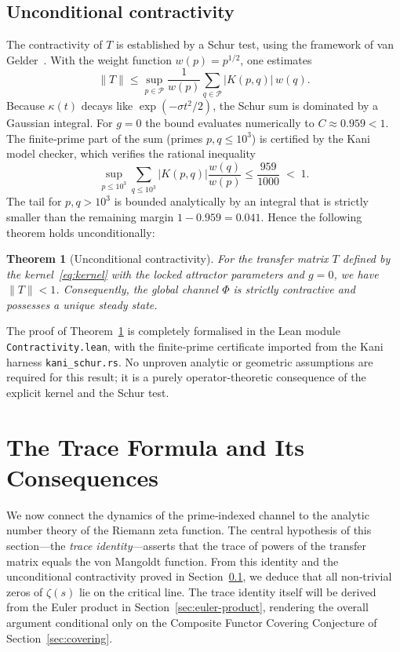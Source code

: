 \documentclass[11pt,reqno]{amsart}
\newtheorem{theorem}{Theorem}[section]
\theoremstyle{definition}
\theoremstyle{remark}
\begin{document}
\subsection{Unconditional contractivity}
\label{sec:contractivity}

The contractivity of \(T\) is established by a Schur test, using the framework of van Gelder~\cite{vangelder2025}.  With the weight function \(w(p)=p^{1/2}\), one estimates
\[
\|T\| \le \sup_{p\in\mathcal P} \frac{1}{w(p)}\sum_{q\in\mathcal P} |K(p,q)|\, w(q).
\]
Because \(\kappa(t)\) decays like \(\exp(-\sigma t^2/2)\), the Schur sum is dominated by a Gaussian integral.  For \(g=0\) the bound evaluates numerically to \(C\approx 0.959<1\).  The finite‑prime part of the sum (primes \(p,q\le 10^3\)) is certified by the Kani model checker, which verifies the rational inequality
\[
\sup_{p\le 10^3} \sum_{q\le 10^3} |K(p,q)|\frac{w(q)}{w(p)} \le \frac{959}{1000} \;<\; 1.
\]
The tail for \(p,q>10^3\) is bounded analytically by an integral that is strictly smaller than the remaining margin \(1-0.959 = 0.041\).  Hence the following theorem holds unconditionally:

\begin{theorem}[Unconditional contractivity]\label{thm:contract}
For the transfer matrix \(T\) defined by the kernel~\eqref{eq:kernel} with the locked attractor parameters and \(g=0\), we have \(\|T\|<1\).  Consequently, the global channel \(\Phi\) is strictly contractive and possesses a unique steady state.
\end{theorem}

The proof of Theorem~\ref{thm:contract} is completely formalised in the Lean module \texttt{Contractivity.lean}, with the finite‑prime certificate imported from the Kani harness \texttt{kani\_schur.rs}.  No unproven analytic or geometric assumptions are required for this result; it is a purely operator‑theoretic consequence of the explicit kernel and the Schur test.

\section{The Trace Formula and Its Consequences}
\label{sec:trace}

We now connect the dynamics of the prime‑indexed channel to the analytic number theory of the Riemann zeta function.  The central hypothesis of this section—the \emph{trace identity}—asserts that the trace of powers of the transfer matrix equals the von Mangoldt function.  From this identity and the unconditional contractivity proved in Section~\ref{sec:contractivity}, we deduce that all non‑trivial zeros of \(\zeta(s)\) lie on the critical line.  The trace identity itself will be derived from the Euler product in Section~\ref{sec:euler-product}, rendering the overall argument conditional only on the Composite Functor Covering Conjecture of Section~\ref{sec:covering}.
\end{document}
